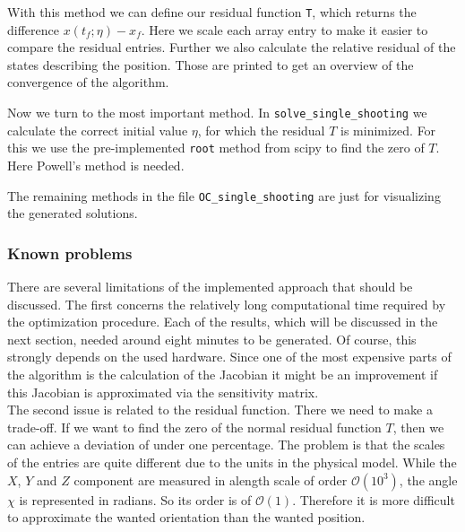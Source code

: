\documentclass[a4paper]{article}
\theoremstyle{definitions}
\theoremstyle{bemerkung}
\theoremstyle{satz}
\theoremstyle{satz}
\newcommand{\code}[1]{\colorbox{backcolour}{\texttt{#1}}}
\begin{document}


With this method we can define our residual function \code{T}, which returns the difference $x(t_f; \eta) - x_f$. Here we scale each array entry to make it easier to compare the residual entries. Further we also calculate the relative residual of the states describing the position. Those are printed to get an overview of the convergence of the algorithm. 



Now we turn to the most important method. In \code{solve\_single\_shooting} we calculate the correct initial value $\eta$, for which the residual $T$ is minimized. For this we use the pre-implemented \code{root} method from scipy to find the zero of $T$. Here Powell's method is needed. 



The remaining methods in the file \code{OC\_single\_shooting} are just for visualizing the generated solutions.

\subsubsection{Known problems}

There are several limitations of the implemented approach that should be discussed. The first concerns the relatively long computational time required by the optimization procedure. Each of the results, which will be discussed in the next section, needed around eight minutes to be generated. Of course, this strongly depends on the used hardware. Since one of the most expensive parts of the algorithm is the calculation of the Jacobian it might be an improvement if this Jacobian is approximated via the sensitivity matrix.\\

The second issue is related to the residual function. There we need to make a trade-off. If we want to find the zero of the normal residual function $T$, then we can achieve a deviation of under one percentage. The problem is that the scales of the entries are quite different due to the units in the physical model. While the $X$, $Y$ and $Z$ component are measured in alength scale of order $\mathcal{O}(10^3)$, the angle $\chi$ is represented in radians. So its order is of $\mathcal{O}(1)$. Therefore it is more difficult to approximate the wanted orientation than the wanted position.
\end{document}
